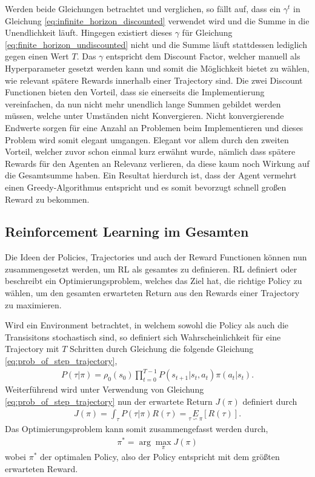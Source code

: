 \documentclass[]{iat}
\begin{document}
Werden beide Gleichungen betrachtet und verglichen, so fällt auf, dass ein $\gamma^t$ in Gleichung \ref{eq:infinite_horizon_discounted} verwendet wird und die Summe in die Unendlichkeit läuft. Hingegen existiert dieses $\gamma$ für Gleichung \ref{eq:finite_horizon_undiscounted} nicht und die Summe läuft stattdessen lediglich gegen einen Wert $T$. Das $\gamma$ entspricht dem Discount Factor, welcher manuell als Hyperparameter gesetzt werden kann und somit die Möglichkeit bietet zu wählen, wie relevant spätere Rewards innerhalb einer Trajectory sind. Die zwei Discount Functionen bieten den Vorteil, dass sie einerseits die Implementierung vereinfachen, da nun nicht mehr unendlich lange Summen gebildet werden müssen, welche unter Umständen nicht Konvergieren. Nicht konvergierende Endwerte sorgen für eine Anzahl an Problemen beim Implementieren und dieses Problem wird somit elegant umgangen. Elegant vor allem durch den zweiten Vorteil, welcher zuvor schon einmal kurz erwähnt wurde, nämlich dass spätere Rewards für den Agenten an Relevanz verlieren, da diese kaum noch Wirkung auf die Gesamtsumme haben. Ein Resultat hierdurch ist, dass der Agent vermehrt einen Greedy-Algorithmus entspricht und es somit bevorzugt schnell großen Reward zu bekommen. \cite[]{SpinningUp2018} \cite[]{Sutton1998}

\subsection{Reinforcement Learning im Gesamten}
Die Ideen der Policies, Trajectories und auch der Reward Functionen können nun zusammengesetzt werden, um RL als gesamtes zu definieren. RL definiert oder beschreibt ein Optimierungsproblem, welches das Ziel hat, die richtige Policy zu wählen, um den gesamten erwarteten Return aus den Rewards einer Trajectory zu maximieren.

Wird ein Environment betrachtet, in welchem sowohl die Policy als auch die Transisitons stochastisch sind, so definiert sich Wahrscheinlichkeit für eine Trajectory mit $T$ Schritten durch Gleichung die folgende Gleichung \ref{eq:prob_of_step_trajectory},
\begin{align}
    P(\tau | \pi) = \rho_0(s_0) \prod _{t = 0}^{T-1} P\left(s_{t+1}|s_t,a_t\right)\pi(a_t|s_t). \label{eq:prob_of_step_trajectory}
\end{align}
Weiterführend wird unter Verwendung von Gleichung \ref{eq:prob_of_step_trajectory} nun der erwartete Return $J(\pi)$ definiert durch
\begin{align}
    J(\pi) = \int_{\tau}^{} P(\tau | \pi) R(\tau) = \underset{\tau \backsim \pi}{E}\left[R(\tau)\right]. \label{eq:expected_return}
\end{align}
Das Optimierungsproblem kann somit zusammengefasst werden durch,
\begin{align}
    \pi^* = \arg \underset{\pi}{\max} J(\pi) \label{eq:optimized_problem}
\end{align}
wobei $\pi^*$ der optimalen Policy, also der Policy entspricht mit dem größten erwarteten Reward. \cite[]{SpinningUp2018} \cite[]{Sutton1998}
\end{document}
